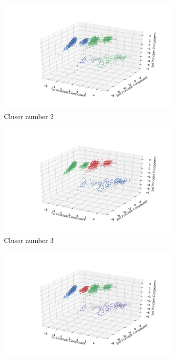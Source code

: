 \documentclass[12pt]{article}
\begin{document}
\begin{figure}
    \centering
    \begin{subfigure}[b]{0.31\textwidth}
        \includegraphics[width=\textwidth]{images/KMeans-trainbyPCA-2.png}
        \caption{Cluser number 2}
        \label{fig:KMeans-trainbyPCA-2}
    \end{subfigure}
    \begin{subfigure}[b]{0.31\textwidth}
        \includegraphics[width=\textwidth]{images/KMeans-trainbyPCA-3.png}
        \caption{Cluser number 3}
        \label{fig:KMeans-trainbyPCA-3}
    \end{subfigure}
    \begin{subfigure}[b]{0.31\textwidth}
        \includegraphics[width=\textwidth]{images/KMeans-trainbyPCA-4.png}

\end{subfigure}
\end{figure}
\end{document}
